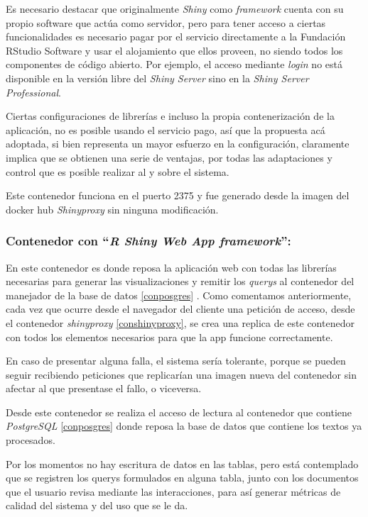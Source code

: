 \documentclass[
  10,
  spanish,
  openany]{book}
\begin{document}
Es necesario destacar que originalmente \emph{Shiny} como \emph{framework} cuenta con su propio software que actúa como servidor, pero para tener acceso a ciertas funcionalidades es necesario pagar por el servicio directamente a la Fundación RStudio Software y usar el alojamiento que ellos proveen, no siendo todos los componentes de código abierto. Por ejemplo, el acceso mediante \emph{login} no está disponible en la versión libre del \emph{Shiny Server} sino en la \emph{Shiny Server Professional}.

Ciertas configuraciones de librerías e incluso la propia contenerización de la aplicación, no es posible usando el servicio pago, así que la propuesta acá adoptada, si bien representa un mayor esfuerzo en la configuración, claramente implica que se obtienen una serie de ventajas, por todas las adaptaciones y control que es posible realizar al y sobre el sistema.

Este contenedor funciona en el puerto 2375 y fue generado desde la imagen del docker hub \emph{Shinyproxy} sin ninguna modificación.

\hypertarget{conshiny}{%
\subsubsection{\texorpdfstring{Contenedor con ``\emph{R Shiny Web App framework}'':}{Contenedor con ``R Shiny Web App framework'':}}\label{conshiny}}

En este contenedor es donde reposa la aplicación web con todas las librerías necesarias para generar las visualizaciones y remitir los \emph{querys} al contenedor del manejador de la base de datos \ref{conposgres} . Como comentamos anteriormente, cada vez que ocurre desde el navegador del cliente una petición de acceso, desde el contenedor \emph{shinyproxy} \ref{conshinyproxy}, se crea una replica de este contenedor con todos los elementos necesarios para que la app funcione correctamente.

En caso de presentar alguna falla, el sistema sería tolerante, porque se pueden seguir recibiendo peticiones que replicarían una imagen nueva del contenedor sin afectar al que presentase el fallo, o viceversa.

Desde este contenedor se realiza el acceso de lectura al contenedor que contiene \emph{PostgreSQL} \ref{conposgres} donde reposa la base de datos que contiene los textos ya procesados.

Por los momentos no hay escritura de datos en las tablas, pero está contemplado que se registren los querys formulados en alguna tabla, junto con los documentos que el usuario revisa mediante las interacciones, para así generar métricas de calidad del sistema y del uso que se le da.
\end{document}
